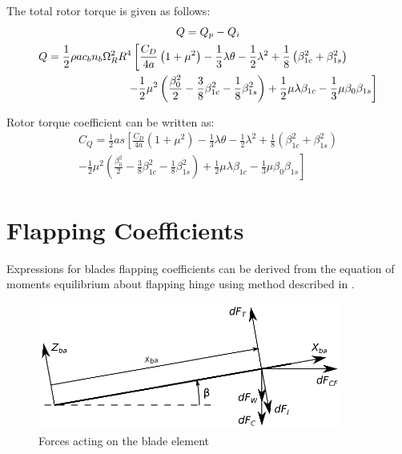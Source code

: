 The total rotor torque is given as follows: \cite{Bramwell2001, NASA-TT-F-494}
\begin{gather}
  Q = Q_p - Q_i \\
  \begin{multlined}[0.88\textwidth]
    Q = \frac{1}{2} \rho a c_b n_b \Omega_R^2 R^4
    \left[
      \frac{C_D}{4a} \left( 1 + \mu^2 \right)
      - \frac{1}{3} \lambda \theta
      - \frac{1}{2} \lambda^2
      + \frac{1}{8} \left( \beta_{1c}^2 + \beta_{1s}^2 \right)
      \right.
      \\
      \left.
      - \frac{1}{2} \mu^2
      \left(
        \frac{\beta_0^2}{2}
        - \frac{3}{8} \beta_{1c}^2
        - \frac{1}{8} \beta_{1s}^2
      \right)
      + \frac{1}{2} \mu \lambda \beta_{1c}
      - \frac{1}{3} \mu \beta_0 \beta_{1s}
    \right]
  \end{multlined}
\end{gather}

Rotor torque coefficient can be written as:
\begin{multline}
  C_Q = \frac{1}{2} a s
  \left[
    \frac{C_D}{4a} \left( 1 + \mu^2 \right)
    - \frac{1}{3} \lambda \theta
    - \frac{1}{2} \lambda^2
    + \frac{1}{8} \left( \beta_{1c}^2 + \beta_{1s}^2 \right)
    \right.
    \\
    \left.
    - \frac{1}{2} \mu^2
    \left(
      \frac{\beta_0^2}{2}
      - \frac{3}{8} \beta_{1c}^2
      - \frac{1}{8} \beta_{1s}^2
    \right)
    + \frac{1}{2} \mu \lambda \beta_{1c}
    - \frac{1}{3} \mu \beta_0 \beta_{1s}
  \right]
\end{multline}

\section{Flapping Coefficients}

Expressions for blades flapping coefficients can be derived from the equation of moments equilibrium about flapping hinge using method described in \cite{NASA-TT-F-494}.

\begin{figure}
  \centering
  \includegraphics[width=100mm]{eps/blade_element_moments.eps}
  \caption{Forces acting on the blade element}
\end{figure}

